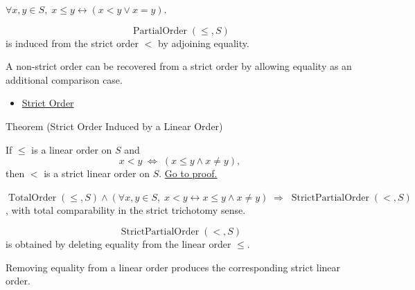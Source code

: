 \begin{remark*}
$\forall x,y\in S,\; x\leq y \leftrightarrow (x<y\vee x=y)$.
\end{remark*}

\begin{remark*}
\[
  \operatorname{PartialOrder}(\leq,S)
\] is induced from the strict order $<$ by
adjoining equality.
\end{remark*}

\begin{remark*}[Interpretation]
A non-strict order can be recovered from a strict order by allowing equality as
an additional comparison case.
\end{remark*}

\begin{dependencies}
\begin{itemize}
  \item \hyperref[def:strict-order]{Strict Order}
\end{itemize}
\end{dependencies}

\begin{theorembox}{Theorem (Strict Order Induced by a Linear Order)}
\begin{theorem}\label{thm:strict-order-induced-by-linear-order}
If $\leq$ is a linear order on $S$ and
\[
x<y \;\Longleftrightarrow\; (x\leq y\land x\neq y),
\]
then $<$ is a strict linear order on $S$.
\hyperref[prf:strict-order-induced-by-linear-order]{Go to proof.}
\end{theorem}
\end{theorembox}

\begin{remark*}
$\operatorname{TotalOrder}(\leq,S)\wedge
(\forall x,y\in S,\; x<y\leftrightarrow x\leq y\wedge x\neq y)
\;\Rightarrow\;\operatorname{StrictPartialOrder}(<,S)$, with total
comparability in the strict trichotomy sense.
\end{remark*}

\begin{remark*}
\[
  \operatorname{StrictPartialOrder}(<,S)
\] is obtained by deleting equality from
the linear order $\leq$.
\end{remark*}

\begin{remark*}[Interpretation]
Removing equality from a linear order produces the corresponding strict linear
order.
\end{remark*}

